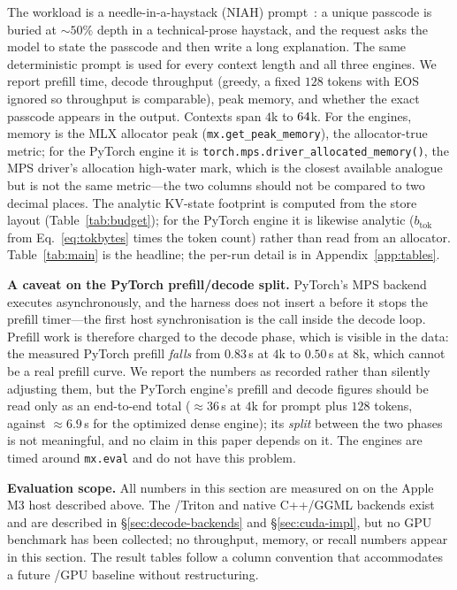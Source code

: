 The workload is a needle-in-a-haystack (NIAH) prompt~\cite{kamradt2023niah}: a unique passcode is
buried at $\sim$$50\%$ depth in a technical-prose haystack, and the request asks the model to state
the passcode and then write a long explanation. The same deterministic prompt is used for every
context length and all three engines. We report prefill time, decode throughput (greedy, a fixed
$128$ tokens with EOS ignored so throughput is comparable), peak memory, and whether the exact
passcode appears in the output. Contexts span $4$k to $64$k. For the \mlxe{} engines, memory is
the MLX allocator peak (\texttt{mx.get\_peak\_memory}), the allocator-true metric; for the PyTorch
engine it is \texttt{torch.mps.driver\_allocated\_memory()}, the MPS driver's allocation
high-water mark, which is the closest available analogue but is not the same metric---the two
columns should not be compared to two decimal places. The analytic KV-state footprint is computed
from the store layout (Table~\ref{tab:budget}); for the PyTorch engine it is likewise analytic
($b_{\text{tok}}$ from Eq.~\eqref{eq:tokbytes} times the token count) rather than read from an
allocator. Table~\ref{tab:main} is the headline\ifext{};
the per-run detail is in Appendix~\ref{app:tables}\fi.

\textbf{A caveat on the PyTorch prefill/decode split.} PyTorch's MPS backend executes
asynchronously, and the harness does not insert a  before it stops
the prefill timer---the first host synchronisation is the  call inside the decode
loop. Prefill work is therefore charged to the decode phase, which is visible in the data: the
measured PyTorch prefill \emph{falls} from $0.83$\,s at $4$k to $0.50$\,s at $8$k, which cannot be
a real prefill curve. We report the numbers as recorded rather than silently adjusting them, but
the PyTorch engine's prefill and decode figures should be read only as an end-to-end total
($\approx36$\,s at $4$k for prompt plus $128$ tokens, against $\approx6.9$\,s for the optimized
dense engine); its \emph{split} between the two phases is not meaningful, and no claim in this
paper depends on it. The \mlxe{} engines are timed around \texttt{mx.eval} and do not have this
problem.

\textbf{Evaluation scope.} All numbers in this section are measured on \mlxe{} on the Apple M3
host described above. The \cuda{}/Triton and native C++/GGML backends exist and are described in
\S\ref{sec:decode-backends} and \S\ref{sec:cuda-impl}, but no GPU benchmark has been collected;
no \cuda{} throughput, memory, or recall numbers appear in this section. The result tables follow
a column convention that accommodates a future \cuda{}/GPU baseline without restructuring.


